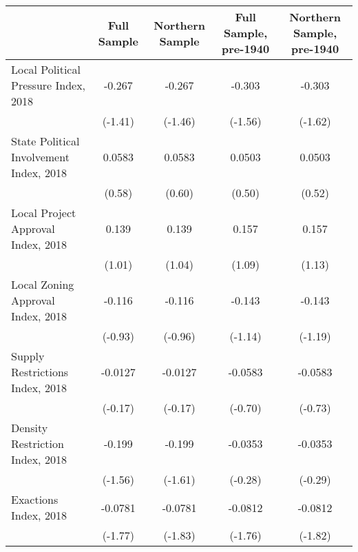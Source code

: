 \begin{table}[htbp]\centering
\def\sym#1{\ifmmode^{#1}\else\(^{#1}\)\fi}
\caption{ \label{tab1}}
\begin{tabular}{l*{4}{c}}
\toprule
                    &\multicolumn{1}{c}{Full Sample}&\multicolumn{1}{c}{Northern Sample}&\multicolumn{1}{c}{Full Sample, pre-1940}&\multicolumn{1}{c}{Northern Sample, pre-1940}\\
\midrule
Local Political Pressure Index, 2018&      -0.267         &      -0.267         &      -0.303         &      -0.303         \\
                    &     (-1.41)         &     (-1.46)         &     (-1.56)         &     (-1.62)         \\
\addlinespace
State Political Involvement Index, 2018&      0.0583         &      0.0583         &      0.0503         &      0.0503         \\
                    &      (0.58)         &      (0.60)         &      (0.50)         &      (0.52)         \\
\addlinespace
Local Project Approval Index, 2018&       0.139         &       0.139         &       0.157         &       0.157         \\
                    &      (1.01)         &      (1.04)         &      (1.09)         &      (1.13)         \\
\addlinespace
Local Zoning Approval Index, 2018&      -0.116         &      -0.116         &      -0.143         &      -0.143         \\
                    &     (-0.93)         &     (-0.96)         &     (-1.14)         &     (-1.19)         \\
\addlinespace
Supply Restrictions Index, 2018&     -0.0127         &     -0.0127         &     -0.0583         &     -0.0583         \\
                    &     (-0.17)         &     (-0.17)         &     (-0.70)         &     (-0.73)         \\
\addlinespace
Density Restriction Index, 2018&      -0.199         &      -0.199         &     -0.0353         &     -0.0353         \\
                    &     (-1.56)         &     (-1.61)         &     (-0.28)         &     (-0.29)         \\
\addlinespace
Exactions Index, 2018&     -0.0781         &     -0.0781         &     -0.0812         &     -0.0812         \\
                    &     (-1.77)         &     (-1.83)         &     (-1.76)         &     (-1.82)         \\

\end{tabular}
\end{table}
